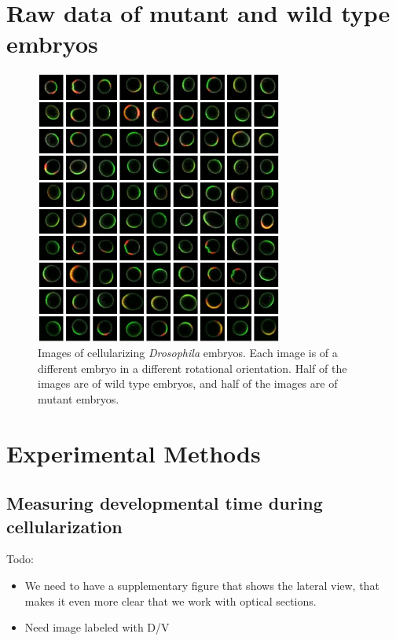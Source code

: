 \documentclass[12pt]{article}
\begin{document}
\section{Raw data of mutant and wild type embryos}

\begin{figure}[H]
\includegraphics[height=9cm]{raw_data3b}
\caption{Images of cellularizing {\it Drosophila} embryos. Each image is of a different embryo in a different rotational orientation. Half of the images are of wild type embryos, and half of the images are of mutant embryos.}
\end{figure}


\section{Experimental Methods}

\subsection{Measuring developmental time during cellularization}

Todo:
\begin{itemize}
\item We need to have a supplementary figure that shows the lateral view, that makes it even more clear that we work with optical sections.

\item Need image labeled with D/V

\end{itemize}
\end{document}

